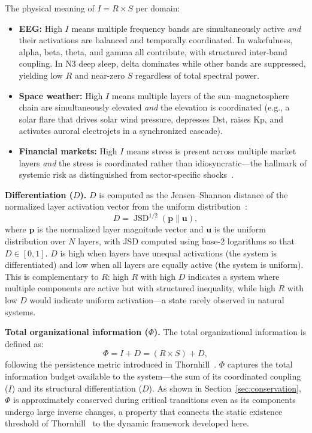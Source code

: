 \documentclass[aip,cha,reprint,amsmath,amssymb,final,floatfix]{revtex4-2}
\begin{document}
The physical meaning of $I = R \times S$ per domain:
\begin{itemize}
\item \textbf{EEG:} High $I$ means multiple frequency bands are simultaneously active \emph{and} their activations are balanced and temporally coordinated. In wakefulness, alpha, beta, theta, and gamma all contribute, with structured inter-band coupling. In N3 deep sleep, delta dominates while other bands are suppressed, yielding low $R$ and near-zero $S$ regardless of total spectral power.
\item \textbf{Space weather:} High $I$ means multiple layers of the sun--magnetosphere chain are simultaneously elevated \emph{and} the elevation is coordinated (e.g., a solar flare that drives solar wind pressure, depresses Dst, raises Kp, and activates auroral electrojets in a synchronized cascade).
\item \textbf{Financial markets:} High $I$ means stress is present across multiple market layers \emph{and} the stress is coordinated rather than idiosyncratic---the hallmark of systemic risk as distinguished from sector-specific shocks~\cite{forbes2002}.
\end{itemize}

\textbf{Differentiation ($D$).} $D$ is computed as the Jensen--Shannon distance of the normalized layer activation vector from the uniform distribution~\cite{lin1991,endres2003}:
\begin{equation}
D = \operatorname{JSD}^{1/2}\left(\mathbf{p} \| \mathbf{u}\right),
\end{equation}
where $\mathbf{p}$ is the normalized layer magnitude vector and $\mathbf{u}$ is the uniform distribution over $N$ layers, with JSD computed using base-2 logarithms so that $D \in [0, 1]$. $D$ is high when layers have unequal activations (the system is differentiated) and low when all layers are equally active (the system is uniform). This is complementary to $R$: high $R$ with high $D$ indicates a system where multiple components are active but with structured inequality, while high $R$ with low $D$ would indicate uniform activation---a state rarely observed in natural systems.

\textbf{Total organizational information ($\Phi$).} The total organizational information is defined as:
\begin{equation}
\Phi = I + D = (R \times S) + D,
\end{equation}
following the persistence metric introduced in Thornhill~\cite{thornhill2026a}. $\Phi$ captures the total information budget available to the system---the sum of its coordinated coupling ($I$) and its structural differentiation ($D$). As shown in Section~\ref{sec:conservation}, $\Phi$ is approximately conserved during critical transitions even as its components undergo large inverse changes, a property that connects the static existence threshold of Thornhill~\cite{thornhill2026a,thornhill2026b,thornhill2026c} to the dynamic framework developed here.
\end{document}
